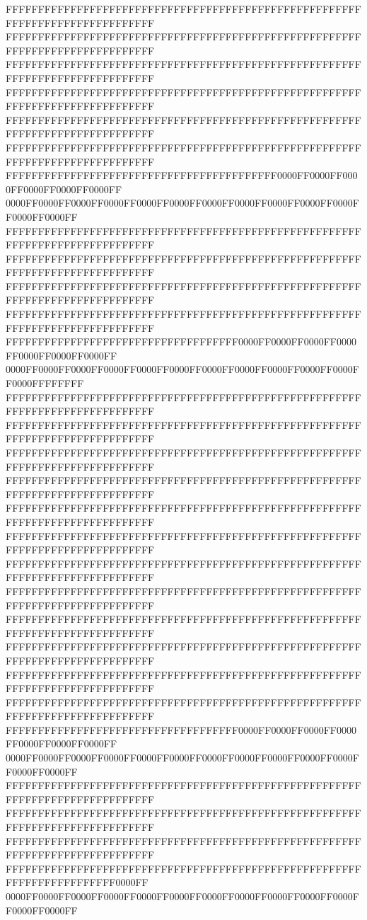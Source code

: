 FFFFFFFFFFFFFFFFFFFFFFFFFFFFFFFFFFFFFFFFFFFFFFFFFFFFFFFFFFFFFFFFFFFFFFFFFFFFFF
FFFFFFFFFFFFFFFFFFFFFFFFFFFFFFFFFFFFFFFFFFFFFFFFFFFFFFFFFFFFFFFFFFFFFFFFFFFFFF
FFFFFFFFFFFFFFFFFFFFFFFFFFFFFFFFFFFFFFFFFFFFFFFFFFFFFFFFFFFFFFFFFFFFFFFFFFFFFF
FFFFFFFFFFFFFFFFFFFFFFFFFFFFFFFFFFFFFFFFFFFFFFFFFFFFFFFFFFFFFFFFFFFFFFFFFFFFFF
FFFFFFFFFFFFFFFFFFFFFFFFFFFFFFFFFFFFFFFFFFFFFFFFFFFFFFFFFFFFFFFFFFFFFFFFFFFFFF
FFFFFFFFFFFFFFFFFFFFFFFFFFFFFFFFFFFFFFFFFFFFFFFFFFFFFFFFFFFFFFFFFFFFFFFFFFFFFF
FFFFFFFFFFFFFFFFFFFFFFFFFFFFFFFFFFFFFFFFFF0000FF0000FF0000FF0000FF0000FF0000FF
0000FF0000FF0000FF0000FF0000FF0000FF0000FF0000FF0000FF0000FF0000FF0000FF0000FF
FFFFFFFFFFFFFFFFFFFFFFFFFFFFFFFFFFFFFFFFFFFFFFFFFFFFFFFFFFFFFFFFFFFFFFFFFFFFFF
FFFFFFFFFFFFFFFFFFFFFFFFFFFFFFFFFFFFFFFFFFFFFFFFFFFFFFFFFFFFFFFFFFFFFFFFFFFFFF
FFFFFFFFFFFFFFFFFFFFFFFFFFFFFFFFFFFFFFFFFFFFFFFFFFFFFFFFFFFFFFFFFFFFFFFFFFFFFF
FFFFFFFFFFFFFFFFFFFFFFFFFFFFFFFFFFFFFFFFFFFFFFFFFFFFFFFFFFFFFFFFFFFFFFFFFFFFFF
FFFFFFFFFFFFFFFFFFFFFFFFFFFFFFFFFFFF0000FF0000FF0000FF0000FF0000FF0000FF0000FF
0000FF0000FF0000FF0000FF0000FF0000FF0000FF0000FF0000FF0000FF0000FF0000FFFFFFFF
FFFFFFFFFFFFFFFFFFFFFFFFFFFFFFFFFFFFFFFFFFFFFFFFFFFFFFFFFFFFFFFFFFFFFFFFFFFFFF
FFFFFFFFFFFFFFFFFFFFFFFFFFFFFFFFFFFFFFFFFFFFFFFFFFFFFFFFFFFFFFFFFFFFFFFFFFFFFF
FFFFFFFFFFFFFFFFFFFFFFFFFFFFFFFFFFFFFFFFFFFFFFFFFFFFFFFFFFFFFFFFFFFFFFFFFFFFFF
FFFFFFFFFFFFFFFFFFFFFFFFFFFFFFFFFFFFFFFFFFFFFFFFFFFFFFFFFFFFFFFFFFFFFFFFFFFFFF
FFFFFFFFFFFFFFFFFFFFFFFFFFFFFFFFFFFFFFFFFFFFFFFFFFFFFFFFFFFFFFFFFFFFFFFFFFFFFF
FFFFFFFFFFFFFFFFFFFFFFFFFFFFFFFFFFFFFFFFFFFFFFFFFFFFFFFFFFFFFFFFFFFFFFFFFFFFFF
FFFFFFFFFFFFFFFFFFFFFFFFFFFFFFFFFFFFFFFFFFFFFFFFFFFFFFFFFFFFFFFFFFFFFFFFFFFFFF
FFFFFFFFFFFFFFFFFFFFFFFFFFFFFFFFFFFFFFFFFFFFFFFFFFFFFFFFFFFFFFFFFFFFFFFFFFFFFF
FFFFFFFFFFFFFFFFFFFFFFFFFFFFFFFFFFFFFFFFFFFFFFFFFFFFFFFFFFFFFFFFFFFFFFFFFFFFFF
FFFFFFFFFFFFFFFFFFFFFFFFFFFFFFFFFFFFFFFFFFFFFFFFFFFFFFFFFFFFFFFFFFFFFFFFFFFFFF
FFFFFFFFFFFFFFFFFFFFFFFFFFFFFFFFFFFFFFFFFFFFFFFFFFFFFFFFFFFFFFFFFFFFFFFFFFFFFF
FFFFFFFFFFFFFFFFFFFFFFFFFFFFFFFFFFFFFFFFFFFFFFFFFFFFFFFFFFFFFFFFFFFFFFFFFFFFFF
FFFFFFFFFFFFFFFFFFFFFFFFFFFFFFFFFFFF0000FF0000FF0000FF0000FF0000FF0000FF0000FF
0000FF0000FF0000FF0000FF0000FF0000FF0000FF0000FF0000FF0000FF0000FF0000FF0000FF
FFFFFFFFFFFFFFFFFFFFFFFFFFFFFFFFFFFFFFFFFFFFFFFFFFFFFFFFFFFFFFFFFFFFFFFFFFFFFF
FFFFFFFFFFFFFFFFFFFFFFFFFFFFFFFFFFFFFFFFFFFFFFFFFFFFFFFFFFFFFFFFFFFFFFFFFFFFFF
FFFFFFFFFFFFFFFFFFFFFFFFFFFFFFFFFFFFFFFFFFFFFFFFFFFFFFFFFFFFFFFFFFFFFFFFFFFFFF
FFFFFFFFFFFFFFFFFFFFFFFFFFFFFFFFFFFFFFFFFFFFFFFFFFFFFFFFFFFFFFFFFFFFFFFF0000FF
0000FF0000FF0000FF0000FF0000FF0000FF0000FF0000FF0000FF0000FF0000FF0000FF0000FF
